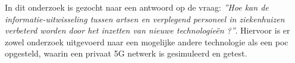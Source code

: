 
In dit onderzoek is gezocht naar een antwoord op de vraag: \textit{''Hoe kan de informatie-uitwisseling tussen artsen en verplegend personeel in ziekenhuizen verbeterd worden door het inzetten van nieuwe technologieën ?''}. Hiervoor is er zowel onderzoek uitgevoerd naar een mogelijke andere technologie als een \gls{poc} opgesteld, waarin een privaat 5G netwerk is gesimuleerd en getest. \\

